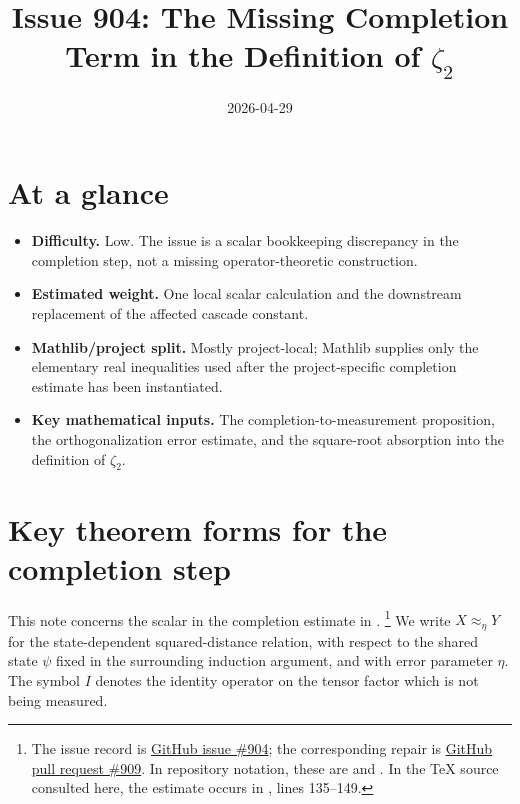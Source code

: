 \documentclass[11pt]{article}
\title{Issue 904: The Missing Completion Term in the Definition of
\texorpdfstring{$\zeta_2$}{zeta2}}
\author{}
\date{2026-04-29}
\begin{document}
\maketitle

\section{At a glance}

\begin{itemize}
  \item \textbf{Difficulty.} Low.  The issue is a scalar bookkeeping
  discrepancy in the completion step, not a missing operator-theoretic
  construction.
  \item \textbf{Estimated weight.} One local scalar calculation and the
  downstream replacement of the affected cascade constant.
  \item \textbf{Mathlib/project split.} Mostly project-local; Mathlib supplies
  only the elementary real inequalities used after the project-specific
  completion estimate has been instantiated.
  \item \textbf{Key mathematical inputs.} The completion-to-measurement
  proposition, the orthogonalization error estimate, and the square-root
  absorption into the definition of \(\zeta_2\).
\end{itemize}

\section{Key theorem forms for the completion step}

This note concerns the scalar in the completion estimate in
\cite[Section~\emph{The main induction step}]{Ji2020LowIndividualDegree}.
\footnote{The issue record is
\href{https://github.com/LionSR/MIPStarRE/issues/904}{GitHub issue \#904}; the
corresponding repair is
\href{https://github.com/LionSR/MIPStarRE/pull/909}{GitHub pull request \#909}.
In repository notation, these are  and .
In the TeX source consulted here, the estimate occurs in
, lines 135--149.}
We write \(X\approx_\eta Y\) for the state-dependent squared-distance relation,
with respect to the shared state \(\psi\) fixed in the surrounding induction
argument, and with error parameter \(\eta\).  The symbol \(I\) denotes the
identity operator on the tensor factor which is not being measured.
\end{document}
